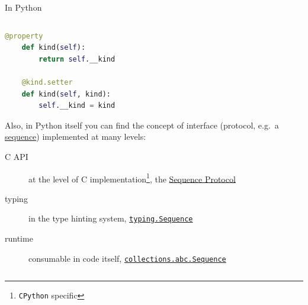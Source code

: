 \documentclass[9pt]{beamer}
\begin{document}
\begin{frame}[fragile]{In Python}
\begin{columns}
\begin{column}{0.5\textwidth}
\begin{lstlisting}[language=Python,style=mystyle]
    @property
    def kind(self):
        return self.__kind

    @kind.setter
    def kind(self, kind):
        self.__kind = kind\end{lstlisting}
            \vspace*{20pt}


            Also, in Python itself you can find the concept of interface
            (protocol, e.g.\ a
            \href{https://docs.python.org/3/glossary.html\#term-sequence}{sequence})
            implemented at many levels:

            \begin{description}
                \item[C API] at the level of C implementation\footnote{
                        \texttt{CPython} specific
                    }, the
                    \href{https://docs.python.org/3/c-api/sequence.html}{Sequence
                    Protocol}
                \item[typing] in the type hinting system,
                    \href{https://docs.python.org/3/library/typing.html?highlight=sequence\#typing.Sequence}{\texttt{typing.Sequence}}
                \item[runtime] consumable in code itself,
                    \href{https://docs.python.org/3/library/collections.abc.html?highlight=sequence\#collections.abc.Sequence}{\texttt{collections.abc.Sequence}} 

            \end{description}
        \end{column}
    \end{columns}
\end{frame}
\end{document}
